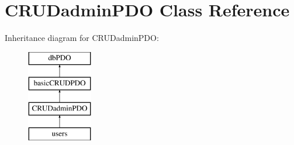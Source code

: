 \hypertarget{class_c_r_u_dadmin_p_d_o}{\section{C\-R\-U\-Dadmin\-P\-D\-O Class Reference}
\label{class_c_r_u_dadmin_p_d_o}
}
Inheritance diagram for C\-R\-U\-Dadmin\-P\-D\-O\-:\begin{figure}[H]
\begin{center}
\leavevmode
\includegraphics[height=4.000000cm]{class_c_r_u_dadmin_p_d_o}
\end{center}
\end{figure}
